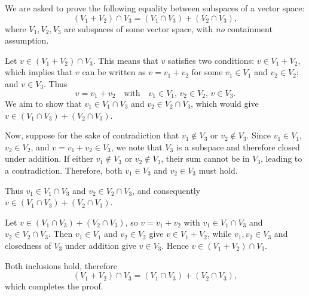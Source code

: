 \begin{failedattempt}
   We are asked to prove the following equality between subspaces of a vector space:
  \[
    (V_1 + V_2) \cap V_3 = (V_1 \cap V_3) + (V_2 \cap V_3),
  \]
  where $V_1, V_2, V_3$ are subspaces of some vector space, with \emph{no} containment assumption.

  Let $v \in (V_1 + V_2) \cap V_3$. This means that $v$ satisfies two conditions: $v \in V_1 + V_2$, which implies that $v$ can be written as $v = v_1 + v_2$ for some $v_1 \in V_1$ and $v_2 \in V_2$; and $v \in V_3$. Thus
  \[
    v = v_1 + v_2 \quad \text{with} \quad v_1 \in V_1, \, v_2 \in V_2, \, v \in V_3.
  \]
  We aim to show that $v_1 \in V_1 \cap V_3$ and $v_2 \in V_2 \cap V_3$, which would give $v \in (V_1 \cap V_3) + (V_2 \cap V_3)$.

  Now, suppose for the sake of contradiction that $v_1 \notin V_3$ or $v_2 \notin V_3$. Since $v_1 \in V_1$, $v_2 \in V_2$, and $v = v_1 + v_2 \in V_3$, we note that $V_3$ is a subspace and therefore closed under addition. If either $v_1 \notin V_3$ or $v_2 \notin V_3$, their sum cannot be in $V_3$, leading to a contradiction. Therefore, both $v_1 \in V_3$ and $v_2 \in V_3$ must hold.

  Thus $v_1 \in V_1 \cap V_3$ and $v_2 \in V_2 \cap V_3$, and consequently $v \in (V_1 \cap V_3) + (V_2 \cap V_3)$.

  Let $v \in (V_1 \cap V_3) + (V_2 \cap V_3)$, so $v = v_1 + v_2$ with $v_1 \in V_1 \cap V_3$ and $v_2 \in V_2 \cap V_3$. Then $v_1 \in V_1$ and $v_2 \in V_2$ give $v \in V_1 + V_2$, while $v_1, v_2 \in V_3$ and closedness of $V_3$ under addition give $v \in V_3$. Hence $v \in (V_1 + V_2) \cap V_3$.

   Both inclusions hold, therefore
  \[
    (V_1 + V_2) \cap V_3 = (V_1 \cap V_3) + (V_2 \cap V_3),
  \]
  which completes the proof.
\end{failedattempt}

